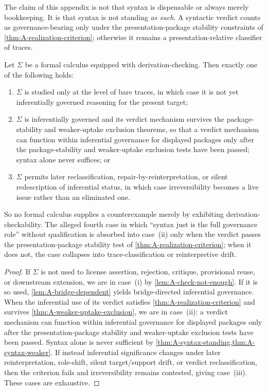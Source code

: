 \begin{remark}
The claim of this appendix is not that syntax is dispensable or always merely bookkeeping. It is that syntax is not standing \emph{as such}. A syntactic verdict counts as governance-bearing only under the presentation-package stability constraints of \cref{thm:A-realization-criterion}; otherwise it remains a presentation-relative classifier of traces.
\end{remark}

\begin{lemma}
\label{lem:A-formalist-trichotomy}
Let $\Sigma$ be a formal calculus equipped with derivation-checking. Then exactly one of the following holds:
\begin{enumerate}[label=(\roman*), leftmargin=2.5em]
    \item $\Sigma$ is studied only at the level of bare traces, in which case it is not yet inferentially governed reasoning for the present target;
    \item $\Sigma$ is inferentially governed and its verdict mechanism survives the package-stability and weaker-uptake exclusion theorems, so that a verdict mechanism can function within inferential governance for displayed packages only after the package-stability and weaker-uptake exclusion tests have been passed; syntax alone never suffices; or
    \item $\Sigma$ permits later reclassification, repair-by-reinterpretation, or silent redescription of inferential status, in which case irreversibility becomes a live issue rather than an eliminated one.
\end{enumerate}
So no formal calculus supplies a counterexample merely by exhibiting derivation-checkability. The alleged fourth case in which ``syntax just is the full governance role'' without qualification is absorbed into case~(ii) only when the verdict passes the presentation-package stability test of \cref{thm:A-realization-criterion}; when it does not, the case collapses into trace-classification or reinterpretive drift.
\end{lemma}

\begin{proof}
If $\Sigma$ is not used to license assertion, rejection, critique, provisional reuse, or downstream extension, we are in case~(i) by \cref{lem:A-check-not-enough}. If it is so used, \cref{lem:A-bridge-dependent} yields bridge-directed inferential governance. When the inferential use of its verdict satisfies \cref{thm:A-realization-criterion} and survives \cref{thm:A-weaker-uptake-exclusion}, we are in case~(ii): a verdict mechanism can function within inferential governance for displayed packages only after the presentation-package stability and weaker-uptake exclusion tests have been passed. Syntax alone is never sufficient by \cref{thm:A-syntax-standing,thm:A-syntax-weaker}. If instead inferential significance changes under later reinterpretation, role-shift, silent target/support drift, or verdict reclassification, then the criterion fails and irreversibility remains contested, giving case~(iii). These cases are exhaustive.
\end{proof}

